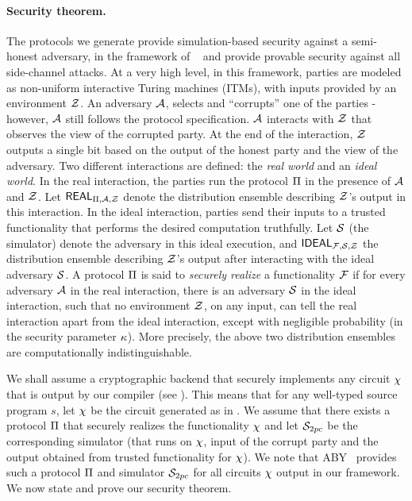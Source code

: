 \paragraph{Security theorem.} The protocols we generate provide
simulation-based security against a semi-honest adversary, in the
framework of ~\cite{gmw,can00,can01} and provide provable security against all side-channel attacks.
At a very high level, in this
framework, parties are modeled as non-uniform interactive Turing
machines (ITMs), with inputs provided by an environment $\mathcal{Z}$. An
adversary $\mathcal{A}$, selects and ``corrupts'' one of the parties -
however, $\mathcal{A}$ still follows the protocol specification. $\mathcal{A}$
interacts with $\mathcal{Z}$ that observes the view of the corrupted
party. At the end of the interaction, $\mathcal{Z}$ outputs a single bit based on the output of the honest party and the view of the adversary. Two
different interactions are defined: the {\em real world} and an {\em
  ideal world}. In the real interaction, the parties run the protocol
$\Pi$ in the presence of $\mathcal{A}$ and $\mathcal{Z}$. Let
$\mathsf{REAL}_{\Pi,\mathcal{A},\mathcal{Z}}$ denote the  distribution ensemble
describing $\mathcal{Z}$'s output in this interaction. 
In the ideal interaction, parties send their inputs to  a
trusted functionality that performs the desired
computation truthfully. Let $\mathcal{S}$ (the simulator) denote the
adversary in this ideal execution, and $\mathsf{IDEAL}_{\mathcal{F},\mathcal{S},\mathcal{Z}}$
the distribution ensemble describing $\mathcal{Z}$'s output after
interacting with the ideal adversary $\mathcal{S}$. A
protocol $\Pi$ is said to {\em securely realize} a functionality
$\mathcal{F}$ if for every adversary $\mathcal{A}$ in the real interaction, there is
an adversary $\mathcal{S}$ in the ideal interaction, such that no
environment $\mathcal{Z}$, on any input, can tell the real interaction apart
from the ideal interaction, except with negligible probability (in the
security parameter $\kappa$). More precisely, the above two
distribution ensembles  are computationally indistinguishable. 

We shall assume a cryptographic \mpc backend that securely implements
any circuit $\chi$ that is output by our compiler
(see ). This means that for any
well-typed source program $s$, let $\chi$ be the circuit generated
as in . We assume that there
exists a \mpc protocol $\Pi$ that securely realizes the
functionality $\chi$ and let $\mathcal{S}_{\tiny{2pc}}$ be the
corresponding simulator  (that runs on $\chi$, input of the corrupt
party and the output obtained from trusted functionality for
$\chi$). We note that ABY~\cite{aby} provides such a protocol
$\Pi$ and simulator $\mathcal{S}_{\tiny{2pc}}$ for all circuits $\chi$
output in our framework. We now state and prove our
security theorem. 
 
